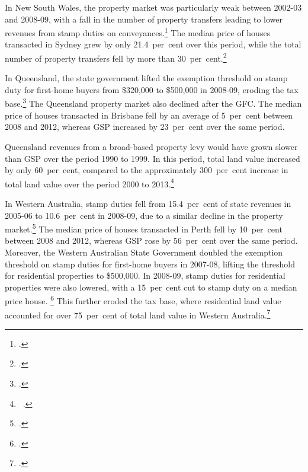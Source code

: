 \documentclass[twoside,english]{palatinob5portrait}
\begin{document}
\begin{subappendices}
In New South Wales, the property market was particularly weak between 2002-03 and  2008-09, with a fall in the number of property transfers leading to lower revenues from stamp duties on conveyances.\footcite[][18]{CGC2009a}  The median price of houses transacted in Sydney grew by only 21.4~per~cent over this period, while the total number of property transfers fell by more than 30~per~cent.\footcite{ABS2015ResidentialPropertyIndex}  

In Queensland, the state government lifted the exemption threshold on stamp duty for first-home buyers from \$320,000 to \$500,000 in 2008-09, eroding the tax base.\footcite{TreasuryTradeQld2012}  The Queensland property market also declined after the GFC. The median price of houses transacted in Brisbane fell by an average of 5~per~cent between 2008 and 2012, whereas GSP increased by 23~per~cent over the same period.  

Queensland revenues from a broad-based property levy would have grown slower than GSP over the period 1990 to 1999. In this period, total land value increased by only 60~per~cent, compared to the approximately 300~per~cent increase in total land value over the period 2000 to 2013.\footnote{\gao\ \textcite{ABS2014e}.}

In Western Australia, stamp duties fell from 15.4~per~cent of state revenues in 2005-06 to 10.6~per~cent in 2008-09, due to a similar decline in the property market.\footcite[][13]{CGC2010b}   The median price of houses transacted in Perth fell by 10~per~cent between 2008 and 2012, whereas GSP rose by 56~per~cent over the same period. Moreover, the Western Australian State Government doubled the exemption threshold on stamp duties for first-home buyers in 2007-08, lifting the threshold for residential properties to \$500,000.  In 2008-09, stamp duties for residential properties were also lowered, with a 15~per~cent cut to stamp duty on a median price house. \footcite{Treasury2007a}   This further eroded the tax base, where residential land value accounted for over 75~per~cent of total land value in Western Australia.\footcite{Treasury2008a}

\cleardoubleevenstandardpage
\newcommand{\propPhantomNotes}{
{\color{white}
\notes{‘Property levy’ shows the revenues that would have been raised with a broad-based property levy of 0.2~per~cent applied to unimproved land values had it been in place over the period.}

\source{\textcites{ABSmultipleyears}{ABS2014e}; Grattan analysis.}}
}


\end{subappendices}
\end{document}
